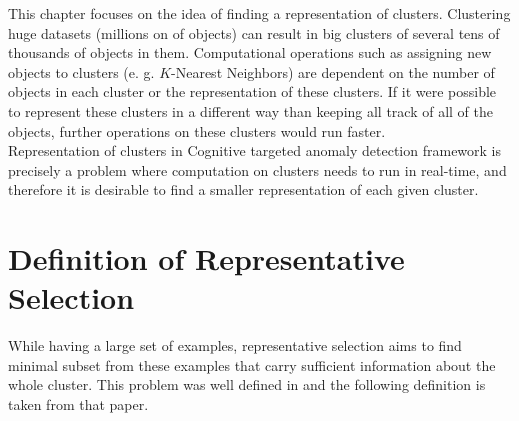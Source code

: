 \documentclass[thesis=B,english]{FITthesis}[2012/10/20]
\begin{document}
This chapter focuses on the idea of finding a representation of clusters.
Clustering huge datasets (millions on of objects) can result in big clusters of several tens of thousands of objects in them.
Computational operations such as assigning new objects to clusters (e. g. $K$-Nearest Neighbors) are dependent on the number of objects in each cluster or the representation of these clusters.
If it were possible to represent these clusters in a different way than keeping all track of all of the objects, further operations on these clusters would run faster. \\

Representation of clusters in Cognitive targeted anomaly detection framework is precisely a problem where computation on clusters needs to run in real-time, and therefore it is desirable to find a smaller representation of each given cluster.

\section{Definition of Representative Selection}\label{sec:def_rep_selection}
While having a large set of examples, representative selection aims to find minimal subset from these examples that carry sufficient information about the whole cluster.
This problem was well defined in \cite{liebman2015representative} and the following definition is taken from that paper.
\end{document}
